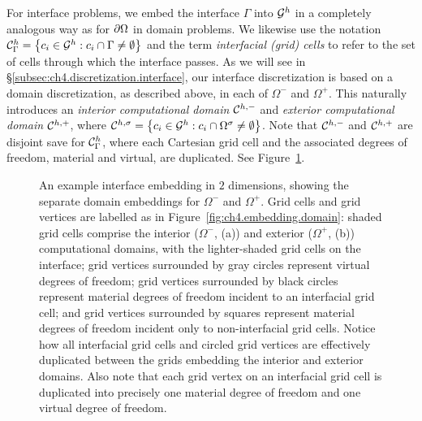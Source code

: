 For interface problems, we embed the interface $\Gamma$ into $\mathcal{G}^h$ in a completely analogous way as for $\partial\Omega$ in domain problems. We likewise use the notation $\mathcal{C}_{\Gamma}^h = \left\lbrace  c_i \in \mathcal{G}^h : c_i \cap \Gamma \neq \emptyset  \right\rbrace$ and the term \emph{interfacial (grid) cells} to refer to the set of cells through which the interface passes. As we will see in \S\ref{subsec:ch4.discretization.interface}, our interface discretization is based on a domain discretization, as described above, in each of $\Omega^-$ and $\Omega^+$. This naturally introduces an \emph{interior computational domain} $\mathcal{C}^{h,-}$ and \emph{exterior computational domain} $\mathcal{C}^{h,+}$, where $\mathcal{C}^{h,\sigma} = \left\lbrace  c_i \in \mathcal{G}^h : c_i \cap \Omega^{\sigma} \neq \emptyset  \right\rbrace$. Note that $\mathcal{C}^{h,-}$ and $\mathcal{C}^{h,+}$ are disjoint save for $\mathcal{C}_{\Gamma}^h$, where each Cartesian grid cell and the associated degrees of freedom, material and virtual, are duplicated. See Figure~\ref{fig:ch4.embedding.interface}.

\newlength\figheightchivembeddinginterface
\setlength{}
\begin{figure}[htbp]
\begin{center}
\caption{An example interface embedding in $2$ dimensions, showing the separate domain embeddings for $\Omega^-$ and $\Omega^+$. Grid cells and grid vertices are labelled as in Figure~\ref{fig:ch4.embedding.domain}: shaded grid cells comprise the interior ($\Omega^-$, (a)) and exterior ($\Omega^+$, (b)) computational domains, with the lighter-shaded grid cells on the interface; grid vertices surrounded by gray circles represent virtual degrees of freedom; grid vertices surrounded by black circles represent material degrees of freedom incident to an interfacial grid cell; and grid vertices surrounded by squares represent material degrees of freedom incident only to non-interfacial grid cells. Notice how all interfacial grid cells and circled grid vertices are effectively duplicated between the grids embedding the interior and exterior domains. Also note that each grid vertex on an interfacial grid cell is duplicated into precisely one material degree of freedom and one virtual degree of freedom.}
\label{fig:ch4.embedding.interface}
\end{center}
\end{figure}

